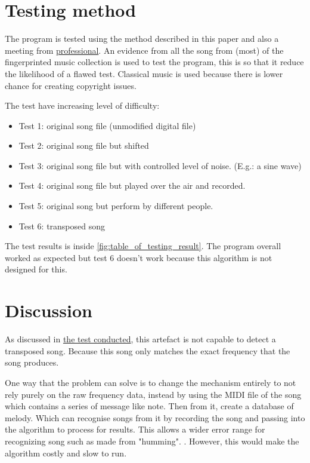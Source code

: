 \cite{wang_systems_2013,macleod_abracadabra_nodate,yang_music_2001}
\chapter{Testing method}
The program is tested using the method described in this paper \cite{yang_music_2001} and also a meeting from  \hyperref[meeting:2]{professional}. An evidence from all the song from (most) of the fingerprinted music collection is used to test the program, this is so that it reduce the likelihood of a flawed test. Classical music is used because there is lower chance for creating copyright issues.

The test have increasing level of difficulty:
\label{chapter:test_methods:methods}
\begin{itemize}
    \item Test 1: original song file (unmodified digital file)
    \item Test 2: original song file but shifted 
    \item Test 3: original song file but with controlled level of noise. (E.g.: a sine wave)
    \item Test 4: original song file but played over the air and recorded.
    \item Test 5: original song but perform by different people.
    \item Test 6: transposed song \label{t:test_transposed}
\end{itemize}
The test results is inside \autoref{fig:table_of_testing_result}.
The program overall worked as expected but test 6 doesn't work because this algorithm is not designed for this.

\chapter{Discussion}

As discussed in \hyperref[t:test_transposed]{the test conducted}, this artefact is not capable to detect a transposed song. Because this song only matches the exact frequency that the song produces. 

One way that the problem can solve is to change the mechanism entirely to not rely purely on the raw frequency data, instead by using the MIDI file of the song which contains a series of message like note. \cite{amandaghassaei_what_nodate} Then from it, create a database of melody. Which can recognise songs from it by recording the song and passing into the algorithm to process for results. This allows a wider error range for recognizing song such as made from "humming". \cite{ghias_query_1995, yang_music_2001}. However, this would make the algorithm costly and slow to run.

